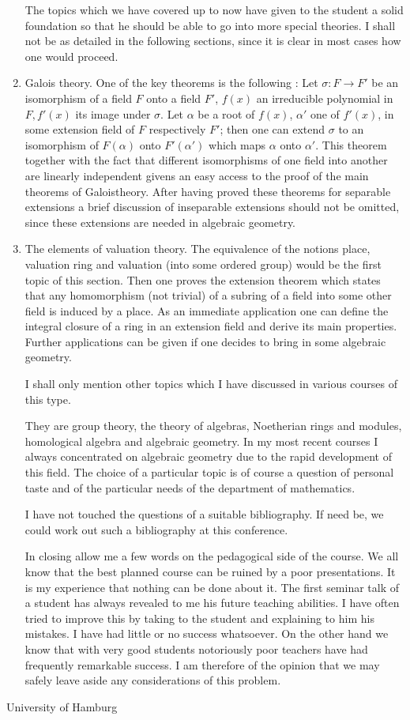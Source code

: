 \begin{enumerate}[(1)]
The topics which we have covered up to now have given to the student a
solid foundation so that he should be able to go into more special
theories. I shall not be as detailed in the following sections, since
it is clear in most cases how one would proceed.

\item Galois theory. One of the key theorems is the following : Let
  $\sigma : F \to F'$ be an isomorphism of a field $F$ onto a field
  $F'$, $f(x)$ an irreducible polynomial in $F, f'(x)$ its image under
  $\sigma$. Let $\alpha$ be a root of $f(x)$, $\alpha'$ one of
  $f'(x)$, in some extension field of $F$ respectively $F'$; then one
  can extend $\sigma$ to an isomorphism of $F(\alpha)$ onto
  $F'(\alpha')$ which maps $\alpha$ onto $\alpha'$. This theorem
  together with the fact that different isomorphisms of one field into
  another are linearly independent givens an easy access to the proof
  of the main theorems of Galois\pageoriginale theory. After having
  proved these theorems for separable extensions a brief discussion of
  inseparable extensions should not be omitted, since these extensions
  are needed in algebraic geometry.

\item The elements of valuation theory. The equivalence of the notions
  place, valuation ring and valuation (into some ordered group) would
  be the first topic of this section. Then one proves the extension
  theorem which states that any homomorphism (not trivial) of a
  subring of a field into some other field is induced by a place. As
  an immediate application one can define the integral closure of a
  ring in an extension field and derive its main properties. Further
  applications can be given if one decides to bring in some algebraic geometry.

I shall only mention other topics which I have discussed in various
courses of this type.

They are group theory, the theory of algebras, Noetherian rings  and
modules, homological algebra and algebraic geometry. In my most recent
courses I always concentrated on algebraic geometry due to the rapid
development of this field. The choice of a particular topic is of
course a question of personal taste and of the particular needs of the
department of mathematics.

I have not touched the questions of a suitable bibliography. If need
be, we could work out such a bibliography at this conference.

In closing allow me a few words on the pedagogical side of the
course. We all know that the best planned course can be ruined by a
poor presentations. It is my experience that nothing can be done about
it. The first seminar talk of a student has always revealed to me his
future teaching abilities. I have often tried to improve this by
taking to the student and explaining to him his mistakes. I have had
little or no success whatsoever. On the other hand we know that with
very good students notoriously poor teachers have had frequently
remarkable success. I am therefore of the opinion that we may safely
leave aside any considerations of this problem.
\end{enumerate}


{\fontsize{9pt}{12pt}\selectfont
University of Hamburg}\relax
